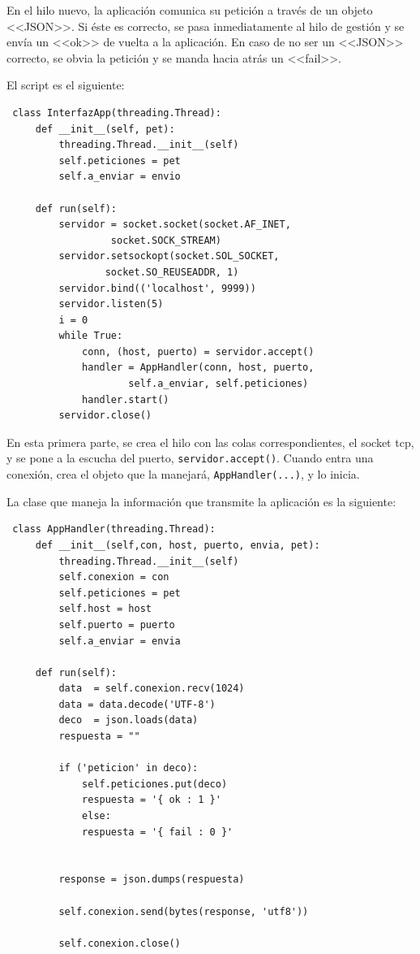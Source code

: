  En el hilo nuevo, la aplicación comunica su petición a través de un objeto <<JSON>>. Si éste es correcto, se pasa inmediatamente al hilo de gestión y se envía un <<ok>> de vuelta a la aplicación. En caso de no ser un <<JSON>> correcto, se obvia la petición y se manda hacia atrás un <<fail>>.
 
 El script es el siguiente:
 \begin{lstlisting}
 class InterfazApp(threading.Thread):
     def __init__(self, pet):
         threading.Thread.__init__(self)
         self.peticiones = pet
         self.a_enviar = envio
 
     def run(self):
         servidor = socket.socket(socket.AF_INET,
                  socket.SOCK_STREAM)
         servidor.setsockopt(socket.SOL_SOCKET, 
                 socket.SO_REUSEADDR, 1)
         servidor.bind(('localhost', 9999))
         servidor.listen(5)
         i = 0
         while True:
             conn, (host, puerto) = servidor.accept()
             handler = AppHandler(conn, host, puerto, 
                     self.a_enviar, self.peticiones)
             handler.start()
         servidor.close()
 \end{lstlisting}
 
 En esta primera parte, se crea el hilo con las colas correspondientes, el socket tcp, y se pone a la escucha del puerto, \lstinline|servidor.accept()|. Cuando entra una conexión, crea el objeto que la manejará, \lstinline|AppHandler(...)|, y lo inicia.
 
 La clase que maneja la información que transmite la aplicación es la siguiente:
 \begin{lstlisting}
 class AppHandler(threading.Thread):
     def __init__(self,con, host, puerto, envia, pet):
         threading.Thread.__init__(self)
         self.conexion = con
         self.peticiones = pet
         self.host = host
         self.puerto = puerto
         self.a_enviar = envia
 
     def run(self):
         data  = self.conexion.recv(1024)
         data = data.decode('UTF-8')
         deco  = json.loads(data)
         respuesta = ""
 
         if ('peticion' in deco):
             self.peticiones.put(deco)
             respuesta = '{ ok : 1 }'
             else:
             respuesta = '{ fail : 0 }'
 
 
         response = json.dumps(respuesta)
 
         self.conexion.send(bytes(response, 'utf8'))
 
         self.conexion.close()
 \end{lstlisting}
 
